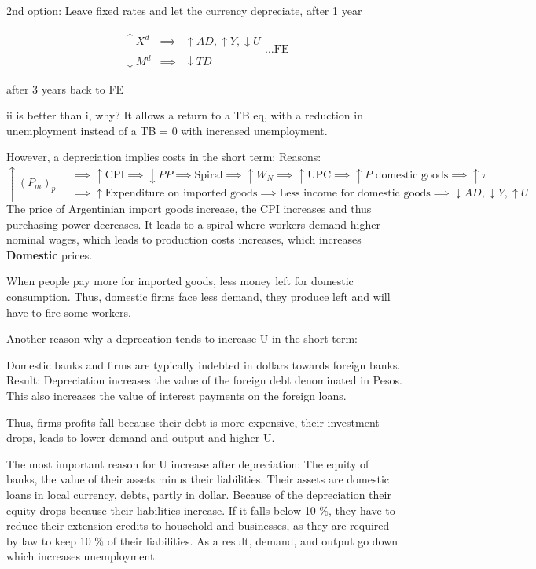 \documentclass{report}
\begin{document}
2nd option: Leave fixed rates and let the currency depreciate, after 1 year 

$$\begin{array}{l|ll}\uparrow X^d & \implies & \uparrow AD, \uparrow Y, \downarrow U \\ \downarrow M^d & \implies & \downarrow TD\end{array} \ldots \text{FE}$$

after 3 years back to FE

ii is better than i, why? It allows a return to a TB eq, with a reduction in unemployment instead of a TB = 0 with increased unemployment. 


However, a depreciation implies costs in the short term:
Reasons:
$$\uparrow (P_m)_p \quad \begin{array}{|ll}\implies \uparrow \text{CPI} \implies \downarrow PP \implies \text{Spiral} \implies \uparrow W_N \implies \uparrow \text{UPC} \implies \uparrow P \text{ domestic goods} \implies \uparrow \pi \\ \implies \uparrow \text{Expenditure on imported goods} \implies \text{Less income for domestic goods} \implies \downarrow AD, \downarrow Y, \uparrow U \end{array}$$
The price of Argentinian import goods increase, the CPI increases and thus purchasing power decreases. It leads to a spiral where workers demand higher nominal wages, which leads to production costs increases, which increases \textbf{Domestic} prices. 


When people pay more for imported goods, less money left for domestic consumption. Thus, domestic firms face less demand, they produce left and will have to fire some workers. 

Another reason why a deprecation tends to increase U in the short term:

Domestic banks and firms are typically indebted in dollars towards foreign banks. 
Result:
Depreciation increases the value of the foreign debt denominated in Pesos. This also increases the value of interest payments on the foreign loans. 

Thus, firms profits fall because their debt is more expensive, their investment drops, leads to lower demand and output and higher U. 

The most important reason for U increase after depreciation:
The equity of banks, the value of their assets minus their liabilities. Their assets are domestic loans in local currency, debts, partly in dollar. Because of the depreciation their equity drops because their liabilities increase. If it falls below 10 \%, they have to reduce their extension credits to household and businesses, as they are required by law to keep 10 \% of their liabilities. As a result, demand, and output go down which increases unemployment. 
\end{document}
